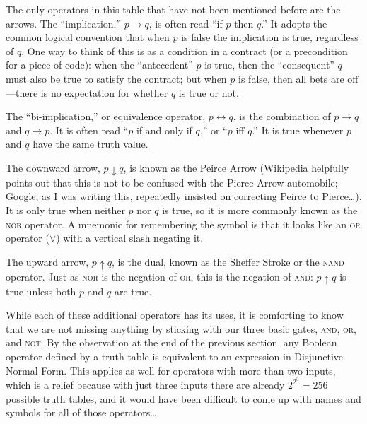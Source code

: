 The only operators in this table that have not been mentioned before are the arrows. The ``implication,'' $p\rightarrow q$, is often read ``if $p$ then $q$.'' It adopts the common logical convention that when $p$ is false the implication is true, regardless of $q$. One way to think of this is as a condition in a contract (or a precondition for a piece of code): when the ``antecedent'' $p$ is true, then the ``consequent'' $q$ must also be true to satisfy the contract; but when $p$ is false, then all bets are off---there is no expectation for whether $q$ is true or not.

The ``bi-implication,'' or equivalence operator, $p\leftrightarrow q$, is the combination of $p\rightarrow q$ and $q\rightarrow p$. It is often read ``$p$ if and only if $q$,'' or ``$p$ iff $q$.'' It is true whenever $p$ and $q$ have the same truth value.

The downward arrow, $p\downarrow q$, is known as the Peirce Arrow (Wikipedia helpfully points out that this is not to be confused with the Pierce-Arrow automobile; Google, as I was writing this, repeatedly insisted on correcting Peirce to Pierce\ldots). It is only true when neither $p$ nor $q$ is true, so it is more commonly known as the \textsc{nor} operator. A mnemonic for remembering the symbol is that it looks like an \textsc{or} operator ($\lor$) with a vertical slash negating it.

The upward arrow, $p\uparrow q$, is the dual, known as the Sheffer Stroke or the \textsc{nand} operator. Just as \textsc{nor} is the negation of \textsc{or}, this is the negation of \textsc{and}: $p\uparrow q$ is true unless both $p$ and $q$ are true.

While each of these additional operators has its uses, it is comforting to know that we are not missing anything by sticking with our three basic gates, \textsc{and}, \textsc{or}, and \textsc{not}. By the observation at the end of the previous section, any Boolean operator defined by a truth table is equivalent to an expression in Disjunctive Normal Form. This applies as well for operators with more than two inputs, which is a relief because with just three inputs there are already $2^{2^3}=256$ possible truth tables, and it would have been difficult to come up with names and symbols for all of those operators\ldots.

